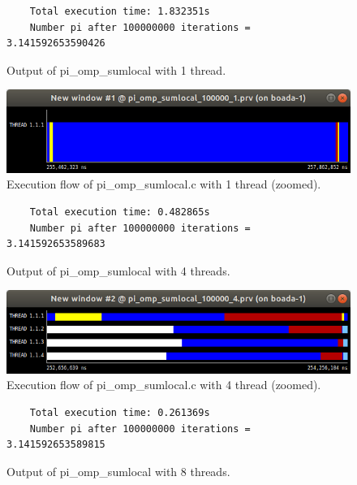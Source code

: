 \documentclass[12pt, a4paper]{article}
\begin{document}
\begin{figure}[H]
	\begin{lstlisting}
	Total execution time: 1.832351s
	Number pi after 100000000 iterations = 3.141592653590426		
	\end{lstlisting}
	\caption{Output of pi\_omp\_sumlocal with 1 thread.}
\end{figure}

\begin{figure}[H]
  \centering
  \includegraphics[scale=0.5]{./images/pi_omp_sumlocal_1_zoom}
  \caption{Execution flow of pi\_omp\_sumlocal.c with 1 thread (zoomed).}
  \label{pi_omp_sumlocal_1_zoom}
\end{figure}

\begin{figure}[H]
	\begin{lstlisting}
	Total execution time: 0.482865s
	Number pi after 100000000 iterations = 3.141592653589683					
	\end{lstlisting}
	\caption{Output of pi\_omp\_sumlocal with 4 threads.}
\end{figure}

\begin{figure}[H]
  \centering
  \includegraphics[scale=0.5]{./images/pi_omp_sumlocal_4_zoom}
  \caption{Execution flow of pi\_omp\_sumlocal.c with 4 thread (zoomed).}
  \label{pi_omp_sumlocal_4_zoom}
\end{figure}

\begin{figure}[H]
	\begin{lstlisting}
	Total execution time: 0.261369s
	Number pi after 100000000 iterations = 3.141592653589815		
	\end{lstlisting}
	\caption{Output of pi\_omp\_sumlocal with 8 threads.}
\end{figure}
\end{document}

